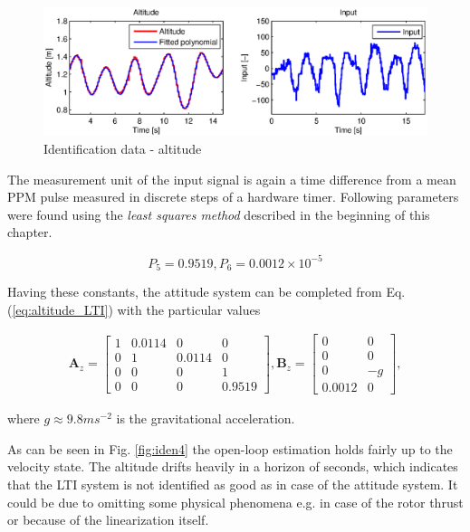 \begin{figure}[h]
\includegraphics[width=1\textwidth]{fig/iden3.eps} 
\caption{Identification data - altitude}
\label{fig:iden3}
\end{figure}

The measurement unit of the input signal is again a time difference from a mean PPM pulse measured in discrete steps of a hardware timer. Following parameters were found using the \emph{least squares method} described in the beginning of this chapter. 

\begin{equation}
P_5 = 0.9519, P_6 = 0.0012 \times 10^{-5} 
\label{eq:constants2}
\end{equation}

Having these constants, the attitude system can be completed from Eq. (\ref{eq:altitude_LTI}) with the particular values

\begin{equation}
\begin{split}
\mathbf{A}_{z} = \begin{bmatrix}
1 & 0.0114 & 0 & 0\\
0 & 1 & 0.0114 & 0\\
0 & 0 & 0 & 1 \\
0 & 0 & 0 & 0.9519
\end{bmatrix}, \mathbf{B}_{z} = \begin{bmatrix}
0 & 0\\
0 & 0\\
0 & -g\\
0.0012 & 0
\end{bmatrix},
\end{split}
\label{eq:altitude_LTI_with_constants}
\end{equation}

where $g \approx 9.8 ms^{-2}$ is the gravitational acceleration.

As can be seen in Fig. \ref{fig:iden4} the open-loop estimation holds fairly up to the velocity state. The altitude drifts heavily in a horizon of seconds, which indicates that the LTI system is not identified as good as in case of the attitude system. It could be due to omitting some physical phenomena e.g. in case of the rotor thrust or because of the linearization itself.

